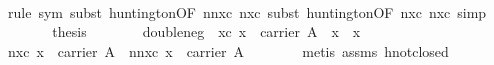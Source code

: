 \begin{isabellebody}
\ \ \ \ \ \ \isamarkupfalse%
\ {}rule\ sym{}\ subst\ huntington{}OF\ nnxc\ nxc{}{}\ subst\ huntington{}OF\ nxc\ nxc{}{}\ simp{}\isanewline
\ \ \ \ \isamarkupfalse%
\ \isamarkupfalse%
\ {}thesis\ \isamarkupfalse%
\isanewline
\ \ \isamarkupfalse%
%
\endisatagproof
{\isafoldproof}%
%
\isadelimproof
\isanewline
%
\endisadelimproof
\isanewline
\ \ \isamarkupfalse%
\ double{}neg{}\ \ xc{}\ {}x\ {}\ carrier\ A{}\ \ {}{}{}{}x{}\ {}\ x{}\isanewline
%
\isadelimproof
\ \ %
\endisadelimproof
%
\isatagproof
{}\isamarkupfalse%
\ {}\isanewline
\ \ \ \ \isamarkupfalse%
\ nxc{}\ {}{}x\ {}\ carrier\ A{}\ \ nnxc{}\ {}{}{}{}x{}\ {}\ carrier\ A{}\isanewline
\ \ \ \ \ \ \isamarkupfalse%
\ {}metis\ assms\ hnot{}closed{}{}\isanewline
\ \ \ \ \isamarkupfalse%

\end{isabellebody}
